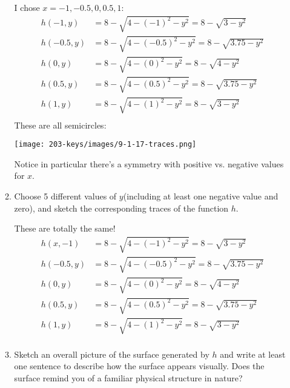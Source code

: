 \documentclass[10pt]{article}
\newenvironment{red}{\color{red}}{\ignorespacesafterend}
\begin{document}
\begin{enumerate}[leftmargin=0pt]
\begin{enumerate}
        \begin{red}
            I chose $x = -1, -0.5, 0, 0.5, 1$:
            \begin{align*}
                h(-1, y) &= 8-\sqrt{4-(-1)^2-y^2} = 8 - \sqrt{3-y^2} \\
                h(-0.5, y) &= 8-\sqrt{4-(-0.5)^2-y^2} = 8 - \sqrt{3.75-y^2} \\
                h(0, y) &= 8-\sqrt{4-(0)^2-y^2} = 8 - \sqrt{4-y^2} \\
                h(0.5, y) &= 8-\sqrt{4-(0.5)^2-y^2} = 8 - \sqrt{3.75-y^2} \\
                h(1, y) &= 8-\sqrt{4-(1)^2-y^2} = 8 - \sqrt{3-y^2} \\
            \end{align*}
            These are all semicircles:
            \begin{center}
                \texttt{[image: 203-keys/images/9-1-17-traces.png]}
            \end{center}
            Notice in particular there's a symmetry with positive vs. negative values for $x$.
        \end{red}

        \item Choose 5 different values of $y$(including at least one negative value and zero), and sketch the corresponding traces of the function $h$.

        \begin{red}
            These are totally the same!
            \begin{align*}
                h(x, -1) &= 8-\sqrt{4-(-1)^2-y^2} = 8 - \sqrt{3-y^2} \\
                h(-0.5, y) &= 8-\sqrt{4-(-0.5)^2-y^2} = 8 - \sqrt{3.75-y^2} \\
                h(0, y) &= 8-\sqrt{4-(0)^2-y^2} = 8 - \sqrt{4-y^2} \\
                h(0.5, y) &= 8-\sqrt{4-(0.5)^2-y^2} = 8 - \sqrt{3.75-y^2} \\
                h(1, y) &= 8-\sqrt{4-(1)^2-y^2} = 8 - \sqrt{3-y^2} \\
            \end{align*}
        \end{red}

        \item Sketch an overall picture of the surface generated by $h$ and write at least one sentence to describe how the surface appears visually. Does the surface remind you of a familiar physical structure in nature?
    \end{enumerate}
\end{enumerate}
\end{document}
